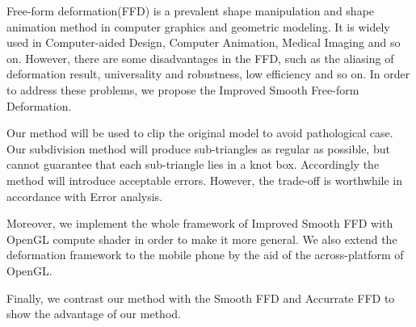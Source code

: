 

\begin{eabstract}
    Free-form deformation(FFD) is a prevalent shape manipulation and shape animation method in computer graphics and geometric modeling. It is widely used in Computer-aided Design, Computer Animation, Medical Imaging and so on. However, there are some disadvantages in the FFD, such as the aliasing of deformation result, universality and robustness, low efficiency and so on. In order to address these problems, we propose the Improved Smooth Free-form Deformation.

    Our method will be used to clip the original model to avoid pathological case. Our subdivision method will produce sub-triangles as regular as possible, but cannot guarantee that each sub-triangle lies in a knot box. Accordingly the method will introduce acceptable errors. However, the trade-off is worthwhile in accordance with Error analysis. 

    Moreover, we implement the whole framework of Improved Smooth FFD with OpenGL compute shader in order to make it more general. We also extend the deformation framework to the mobile phone by the aid of the across-platform of OpenGL.

    Finally, we contrast our method with the Smooth FFD and Accurrate FFD to show the advantage of our method.
\end{eabstract}

